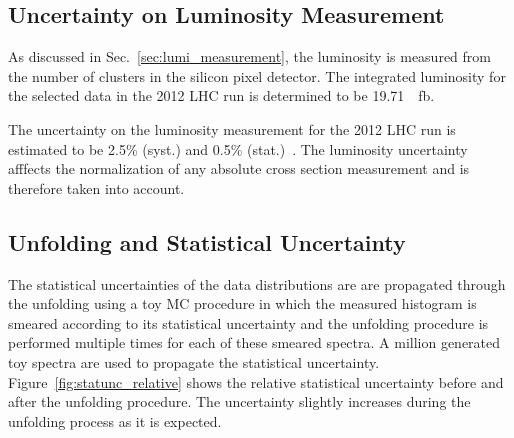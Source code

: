 
\subsection {Uncertainty on Luminosity Measurement}

As discussed in Sec.~\ref{sec:lumi_measurement}, the luminosity is measured from
the number of clusters in the silicon pixel detector. The integrated luminosity
for the selected data in the 2012 LHC run is determined to be \SI{19.71}{\per
\femto \barn}. 

The uncertainty on the luminosity measurement for the 2012 LHC run is estimated
to be 2.5\% (syst.) and 0.5\% (stat.)~\cite{CMS-PAS-LUM-13-001}. The luminosity
uncertainty afffects the normalization of any absolute cross section measurement
and is therefore taken into account.

\subsection{Unfolding and Statistical Uncertainty}
\label{sec:stat_unf_uncert}

The statistical uncertainties of the data distributions are are propagated
through the unfolding using a toy MC procedure in which the measured histogram
is smeared according to its statistical uncertainty and the unfolding procedure
is performed multiple times for each of these smeared spectra. A million
generated toy spectra are used to propagate the statistical uncertainty.
Figure~\ref{fig:statunc_relative} shows the relative statistical uncertainty before and
after the unfolding procedure. The uncertainty slightly increases during the unfolding
process as it is expected.

